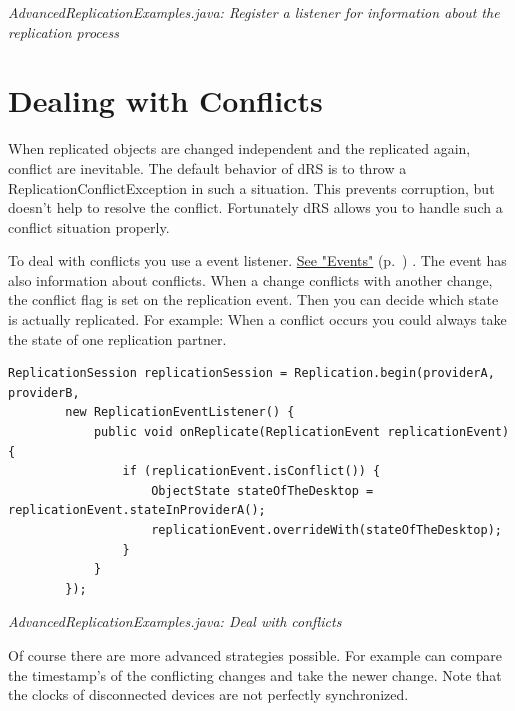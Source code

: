 {\small\itshape AdvancedReplicationExamples.java: Register a listener for information about the replication process\par}
\medskip

\section{Dealing with Conflicts}
\label{drs:db4o-replication-system-drs-advanced-replication-strategies-dealing-with-conflicts}

When replicated objects are changed independent and the replicated again, conflict are inevitable. The default behavior of dRS is to throw a ReplicationConflictException in such a situation. This prevents corruption, but doesn't help to resolve the conflict. Fortunately dRS allows you to handle such a conflict situation properly.

To deal with conflicts you use a event listener. \hyperref[drs:db4o-replication-system-drs-advanced-replication-strategies-events]{See "Events"} (p.~\pageref{drs:db4o-replication-system-drs-advanced-replication-strategies-events}) . The event has also information about conflicts. When a change conflicts with another change, the conflict flag is set on the replication event. Then you can decide which state is actually replicated. For example: When a conflict occurs you could always take the state of one replication partner.

\begin{lstlisting}
ReplicationSession replicationSession = Replication.begin(providerA, providerB,
        new ReplicationEventListener() {
            public void onReplicate(ReplicationEvent replicationEvent) {
                if (replicationEvent.isConflict()) {
                    ObjectState stateOfTheDesktop = replicationEvent.stateInProviderA();
                    replicationEvent.overrideWith(stateOfTheDesktop);
                }
            }
        });
\end{lstlisting}

{\small\itshape AdvancedReplicationExamples.java: Deal with conflicts\par}
\medskip

Of course there are more advanced strategies possible. For example can compare the timestamp's of the conflicting changes and take the newer change. Note that the clocks of disconnected devices are not perfectly synchronized.

